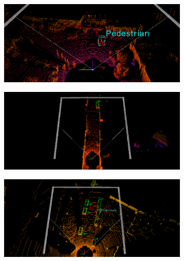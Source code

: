 \begin{figure}[H]
  \begin{subfigure}[t]{.48\textwidth}
    \centering
    \includegraphics[width=\linewidth]{Book/figures/9_completo/complete_0.png}
  \end{subfigure}
  \hfill
  \begin{subfigure}[t]{.48\textwidth}
    \centering
    \includegraphics[width=\linewidth]{Book/figures/9_completo/complete_1.png}
  \end{subfigure}
  \bigbreak
  \begin{subfigure}[t]{.48\textwidth}
    \centering
    \includegraphics[width=\linewidth]{Book/figures/9_completo/complete_2.png}
  \end{subfigure}
  \hfill
  \begin{subfigure}[t]{.48\textwidth}

\end{subfigure}
\end{figure}
